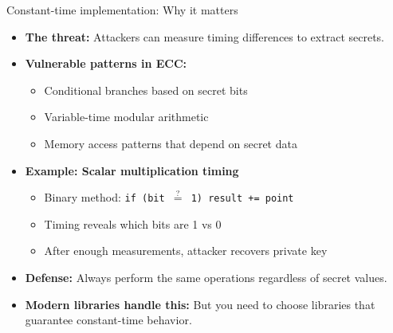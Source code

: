\documentclass[aspectratio=169, lualatex, handout]{beamer}
\begin{document}
\begin{frame}{Constant-time implementation: Why it matters}
	\begin{itemize}
		\item \textbf{The threat:} Attackers can measure timing differences to extract secrets.
		\item \textbf{Vulnerable patterns in ECC:}
		      \begin{itemize}
			      \item Conditional branches based on secret bits
			      \item Variable-time modular arithmetic
			      \item Memory access patterns that depend on secret data
		      \end{itemize}
		\item \textbf{Example: Scalar multiplication timing}
		      \begin{itemize}
			      \item Binary method: \texttt{if (bit $\stackrel{?}{=}$ 1) result += point}
			      \item Timing reveals which bits are 1 vs 0
			      \item After enough measurements, attacker recovers private key
		      \end{itemize}
		\item \textbf{Defense:} Always perform the same operations regardless of secret values.
		\item \textbf{Modern libraries handle this:} But you need to choose libraries that guarantee constant-time behavior.
	\end{itemize}
\end{frame}
\end{document}
